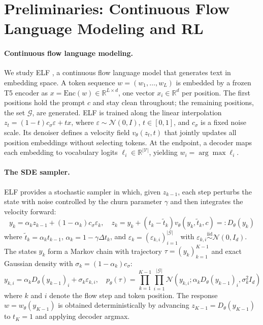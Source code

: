 \section{Preliminaries: Continuous Flow Language Modeling and RL}
\label{sec:estimators}

\paragraph{Continuous flow language modeling.}
We study ELF \citep{hu2026elf}, a continuous flow language model that generates text in embedding space. A token sequence $w=(w_1,\dots,w_L)$ is embedded by a frozen T5 encoder \citep{raffel2020t5} as $x=\mathrm{Enc}(w)\in\mathbb R^{L\times d}$, one vector $x_i\in\mathbb R^d$ per position. The first positions hold the prompt $c$ and stay clean throughout; the remaining positions, the set $\mathcal G$, are generated. ELF is trained along the linear interpolation $z_t=(1-t)c_\sigma\varepsilon+tx$, where
$\varepsilon\sim\mathcal N(0,I)$, $t\in[0,1]$, and $c_\sigma$ is a fixed noise scale. Its denoiser defines a velocity field $v_\theta(z_t,t)$ that jointly updates all position embeddings without selecting tokens. At the endpoint, a decoder maps each embedding to vocabulary logits $\ell_i\in\mathbb R^{|\mathcal V|}$, yielding $w_i=\arg\max\ell_i$. 

\paragraph{The SDE sampler.}
ELF provides a stochastic sampler in which, given $z_{k-1}$, each step perturbs the state with noise controlled by the churn parameter 
$\gamma$ and then integrates the velocity forward:
\begin{equation}
y_k=\alpha_k z_{k-1}+(1-\alpha_k)c_\sigma\varepsilon_k, \quad z_k=y_k+(t_k-\tilde t_k)v_\theta(y_k,\tilde t_k,c)=:D_\theta(y_k)
\end{equation}
where $\tilde t_k=\alpha_k t_{k-1}$, $\alpha_k=1-\gamma \Delta t_k$, and $\varepsilon_k=(\varepsilon_{k,i})_{i=1}^{|\mathcal G|}$ with $\varepsilon_{k,i}\overset{\mathrm{iid}}{\sim}\mathcal N(0,I_d)$. The states $y_k$ form a Markov chain with trajectory $\tau=(y_k)_{k=1}^{K-1}$ and exact Gaussian density with $\sigma_k=(1-\alpha_k)c_\sigma$:
\begin{equation}
y_{k,i}=\alpha_kD_\theta(y_{k-1})_i+\sigma_k\varepsilon_{k,i}, \quad p_\theta(\tau)=\prod_{k=1}^{K-1}\prod_{i=1}^{|\mathcal G|}\mathcal N\!\left(y_{k,i};\alpha_kD_\theta(y_{k-1})_i,\sigma_k^2I_d\right)
\label{eq:chain}
\end{equation}
where $k$ and $i$ denote the flow step and token position. The response $w=w_\theta(y_{K-1})$ is obtained deterministically by advancing $z_{K-1}=D_\theta(y_{K-1})$ to $t_K=1$ and applying decoder argmax.

